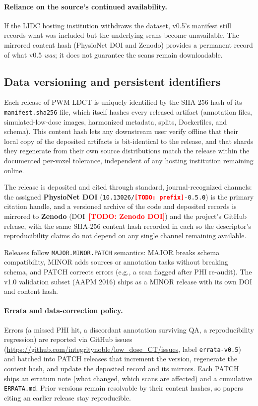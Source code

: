 \documentclass[twoside,11pt]{article}
\newcommand{\todo}[1]{\textcolor{red}{\textbf{[TODO: #1]}}}
\begin{document}
\paragraph{Reliance on the source's continued availability.} If the LIDC hosting institution withdraws the dataset, v0.5's manifest still records what was included but the underlying scans become unavailable. The mirrored content hash (PhysioNet DOI and Zenodo) provides a permanent record of what v0.5 \textit{was}; it does not guarantee the scans remain downloadable.

\subsection*{Data versioning and persistent identifiers}

Each release of PWM-LDCT is uniquely identified by the SHA-256 hash of its \texttt{manifest.sha256} file, which itself hashes every released artifact (annotation files, simulated-low-dose images, harmonized metadata, splits, Dockerfiles, and schema). This content hash lets any downstream user verify offline that their local copy of the deposited artifacts is bit-identical to the release, and that shards they regenerate from their own source distributions match the release within the documented per-voxel tolerance, independent of any hosting institution remaining online.

The release is deposited and cited through standard, journal-recognized channels: the assigned \textbf{PhysioNet DOI} (\texttt{10.13026/\todo{prefix}-0.5.0}) is the primary citation handle, and a versioned archive of the code and deposited records is mirrored to \textbf{Zenodo} (DOI~\todo{Zenodo DOI}) and the project's GitHub release, with the same SHA-256 content hash recorded in each so the descriptor's reproducibility claims do not depend on any single channel remaining available.

Releases follow \texttt{MAJOR.MINOR.PATCH} semantics: MAJOR breaks schema compatibility, MINOR adds sources or annotation tasks without breaking schema, and PATCH corrects errors (e.g., a scan flagged after PHI re-audit). The v1.0 validation subset (AAPM 2016) ships as a MINOR release with its own DOI and content hash.

\paragraph{Errata and data-correction policy.} Errors (a missed PHI hit, a discordant annotation surviving QA, a reproducibility regression) are reported via GitHub issues (\url{https://github.com/integritynoble/low_dose_CT/issues}, label \texttt{errata-v0.5}) and batched into PATCH releases that increment the version, regenerate the content hash, and update the deposited record and its mirrors. Each PATCH ships an erratum note (what changed, which scans are affected) and a cumulative \texttt{ERRATA.md}. Prior versions remain resolvable by their content hashes, so papers citing an earlier release stay reproducible.
\end{document}
